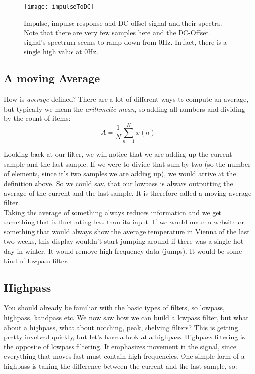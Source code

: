 \begin{figure}[H]
	\centering
	\texttt{[image: impulseToDC]}
	\caption[Spectrum Impulse, Lowpass, DC]
	{Impulse, impulse response and DC offset signal and their spectra. Note that there are very few samples here and the DC-Offset signal's spectrum seems to ramp down from 0Hz. In fact, there is a single high value at 0Hz.}
	\label{fig:impToDc}
\end{figure}

\subsection{A moving Average}
How is \textit{average} defined? There are a lot of different ways to compute an average, but typically we mean the \textit{arithmetic mean}, so adding all numbers and dividing by the count of items:
\begin{equation}
	A = \frac{1}{N} \sum_{n=1}^N x(n)
\end{equation}

Looking back at our filter, we will notice that we are adding up the current sample and the last sample. If we were to divide that sum by two (so the number of elements, since it's two samples we are adding up), we would arrive at the definition above. So we could say, that our lowpass is always outputting the average of the current and the last sample. It is therefore called a moving average filter. \\
Taking the average of something always reduces information and we get something that is fluctuating less than its input. If we would make a website or something that would always show the average temperature in Vienna of the last two weeks, this display wouldn't start jumping around if there was a single hot day in winter. It would remove high frequency data (jumps). It would be some kind of lowpass filter.

\subsection{Highpass} %
\label{sub:Highpass}

You should already be familiar with the basic types of filters, so lowpass, highpass, bandpass etc. We now saw how we can build a lowpass filter, but what about a highpass, what about notching, peak, shelving filters? This is getting pretty involved quickly, but let's have a look at a highpass. Highpass filtering is the opposite of lowpass filtering. It emphasizes movement in the signal, since everything that moves fast must contain high frequencies. One simple form of a highpass is taking the difference between the current and the last sample, so:


